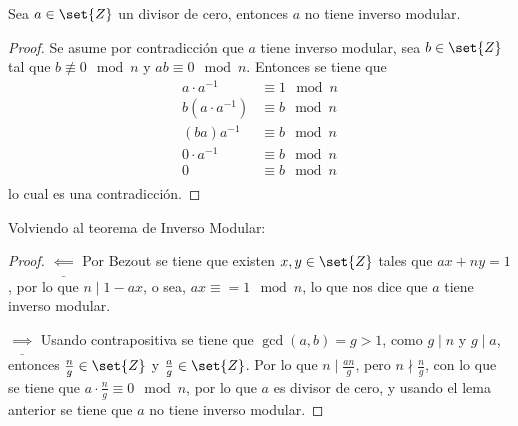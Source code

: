 \documentclass{ayudantia}
\begin{document}
\begin{lem}
    Sea \(a\in\set{Z}\) un divisor de cero, entonces \(a\) no tiene inverso modular.
\end{lem}
\begin{proof}
    Se asume por contradicción que \(a\) tiene inverso modular, sea \(b\in\set{Z}\) tal que \(b\not\equiv0\mod n\) y \(ab\equiv0\mod n\). Entonces se tiene que
    \begin{align*}
        a\cdot a^{-1}&\equiv 1\mod n\\
        b(a\cdot a^{-1})&\equiv b\mod n\\
        (ba)a^{-1}&\equiv b\mod n\\
        0\cdot a^{-1}&\equiv b\mod n\\
        0&\equiv b\mod n\\
    \end{align*}
    lo cual es una contradicción.
\end{proof}
Volviendo al teorema de Inverso Modular:
\begin{proof}
    \(\underline{\impliedby }\) Por Bezout se tiene que existen \(x,y\in\set{Z}\) tales que \(ax+ny=1\), por lo que \(n\mid 1-ax\), o sea, \(ax\equiv=1\mod n\), lo que nos dice que \(a\) tiene inverso modular.
    
    \(\underline{\implies}\) Usando contrapositiva se tiene que \(\gcd(a,b)=g>1\), como \(g\mid n\) y \(g\mid a\), entonces \(\frac{n}{g}\in\set{Z}\) y \(\frac{a}{g}\in\set{Z}\). Por lo que \(n\mid\frac{an}g\), pero \(n\nmid \frac{n}g\), con lo que se tiene que \(a\cdot\frac{n}g\equiv 0\mod n\), por lo que \(a\) es divisor de cero, y usando el lema anterior se tiene que \(a\) no tiene inverso modular.
\end{proof}
\end{document}
